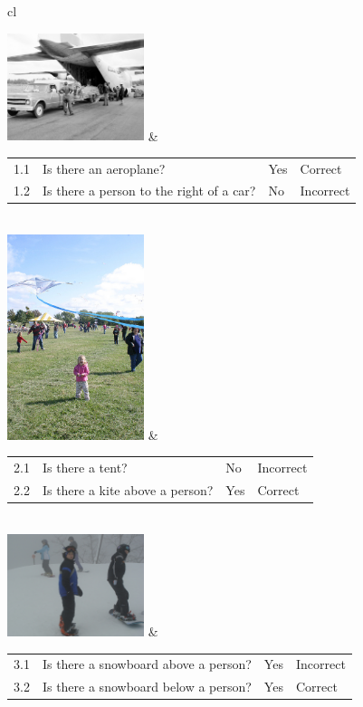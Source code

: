 \begin{table}
\begin{tabular}{cl}
  
	\includegraphics[width=0.3\textwidth]{vqa1.jpg} &
	\begin{tabular}{llll}
		1.1 & Is there an aeroplane? & Yes & Correct \\
		1.2 & Is there a person to the right of a car? & No & Incorrect
		\end{tabular} \\
		
	\includegraphics[width=0.3\textwidth]{vqa2.jpg} &
	\begin{tabular}{llll}
		2.1 & Is there a tent? & No & Incorrect \\
		2.2 & Is there a kite above a person? & Yes & Correct
		\end{tabular} \\
		
	\includegraphics[width=0.3\textwidth]{vqa3.jpg} &
	\begin{tabular}{llll}
		3.1 & Is there a snowboard above a person? & Yes & Incorrect \\
		3.2 & Is there a snowboard below a person? & Yes & Correct
		\end{tabular} \\
		

\end{tabular}
\end{table}

